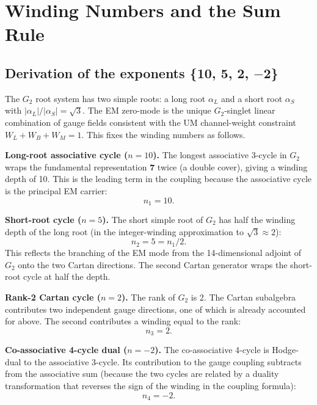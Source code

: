 \documentclass[12pt]{article}
\begin{document}
\section{Winding Numbers and the Sum Rule}

\subsection{Derivation of the exponents \{10, 5, 2, $-$2\}}

The $G_2$ root system has two simple roots: a long root $\alpha_L$ and
a short root $\alpha_S$ with $|\alpha_L|/|\alpha_S| = \sqrt{3}$. The
EM zero-mode is the unique $G_2$-singlet linear combination of gauge
fields consistent with the UM channel-weight constraint
$W_L + W_B + W_M = 1$. This fixes the winding numbers as follows.

\medskip
\textbf{Long-root associative cycle ($n = 10$).}
The longest associative 3-cycle in $G_2$ wraps the fundamental
representation \textbf{7} twice (a double cover), giving a winding
depth of 10. This is the leading term in the coupling because the
associative cycle is the principal EM carrier:
\begin{equation}
  n_1 = 10.
  \label{eq:n1}
\end{equation}

\textbf{Short-root cycle ($n = 5$).}
The short simple root of $G_2$ has half the winding depth of the long
root (in the integer-winding approximation to $\sqrt{3} \approx 2$):
\begin{equation}
  n_2 = 5 = n_1 / 2.
  \label{eq:n2}
\end{equation}
This reflects the branching of the EM mode from the 14-dimensional
adjoint of $G_2$ onto the two Cartan directions. The second Cartan
generator wraps the short-root cycle at half the depth.

\textbf{Rank-2 Cartan cycle ($n = 2$).}
The rank of $G_2$ is 2. The Cartan subalgebra contributes two
independent gauge directions, one of which is already accounted for
above. The second contributes a winding equal to the rank:
\begin{equation}
  n_3 = 2.
  \label{eq:n3}
\end{equation}

\textbf{Co-associative 4-cycle dual ($n = -2$).}
The co-associative 4-cycle is Hodge-dual to the associative 3-cycle.
Its contribution to the gauge coupling subtracts from the associative
sum (because the two cycles are related by a duality transformation
that reverses the sign of the winding in the coupling formula):
\begin{equation}
  n_4 = -2.
  \label{eq:n4}
\end{equation}
\end{document}
